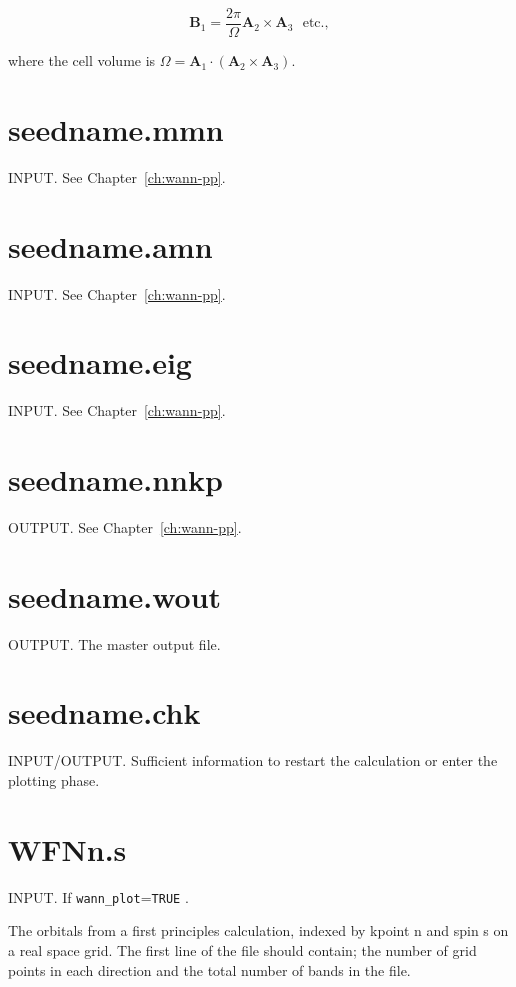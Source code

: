 \begin{equation}
\mathbf{B}_{1} = \frac{2\pi}{\Omega}\mathbf{A}_{2}\times\mathbf{A}_{3}
\ \ \ \mathrm{etc.},
\end{equation}

where the cell volume is
$\Omega=\mathbf{A}_{1}\cdot(\mathbf{A}_{2}\times\mathbf{A}_{3})$.

\section{seedname.mmn}
INPUT. See Chapter~\ref{ch:wann-pp}.

\section{seedname.amn}
INPUT. See Chapter~\ref{ch:wann-pp}.

\section{seedname.eig}
INPUT. See Chapter~\ref{ch:wann-pp}.

\section{seedname.nnkp} \label{sec:old-nnkp}
OUTPUT. See Chapter~\ref{ch:wann-pp}.

\section{seedname.wout}
OUTPUT. The master output file.


\section{seedname.chk}
INPUT/OUTPUT. Sufficient information to restart the calculation or enter the
plotting phase.

\section{WFNn.s}
INPUT. If  \verb#wann_plot#=\verb#TRUE# 
. 

The orbitals from a first
principles calculation, indexed by kpoint n and spin s on a real space
grid.
The first line of the file should contain; the number of grid points in each
direction and the total number of bands in
the file.






